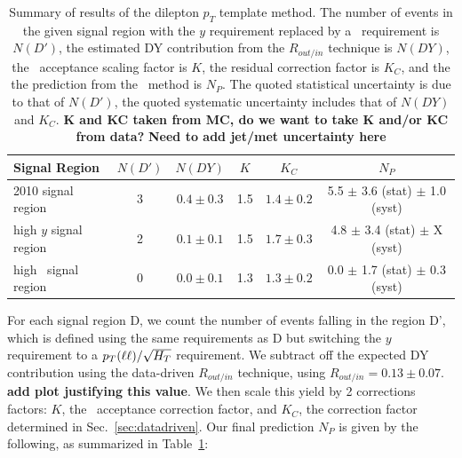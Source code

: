 \begin{table}[hbt]
\begin{center}
\caption{\label{tab:victory} 
Summary of results of the dilepton $p_{T}$ template method.
The number of events in the given signal region with the $y$ requirement replaced by a \ptht\
requirement is $N(D')$, the estimated DY contribution from the $R_{out/in}$ technique is $N(DY)$,
the \met\ acceptance scaling factor is $K$, the residual correction factor is $K_C$, and
the the prediction from the \ptll\ method is $N_P$. The quoted statistical uncertainty is due to
that of $N(D')$, the quoted systematic uncertainty includes that of $N(DY)$ and $K_C$.
{\bf K and KC taken from MC, do we want to take K and/or KC from data? }
{\bf Need to add jet/met uncertainty here}
}
\begin{tabular}{lccccc}
\hline
Signal Region           &  $N(D')$   &   $N(DY)$         &  $K$   &   $K_C$          & $N_P$  \\ 
\hline
2010 signal region      &      3     &   $0.4 \pm 0.3$   &  1.5   &   $1.4 \pm 0.2$  & 5.5 $\pm$ 3.6 (stat) $\pm$ 1.0 (syst) \\
high $y$ signal region  &      2     &   $0.1 \pm 0.1$   &  1.5   &   $1.7 \pm 0.3$  & 4.8 $\pm$ 3.4 (stat) $\pm$ X (syst) \\
high \Ht\ signal region &      0     &   $0.0 \pm 0.1$   &  1.3   &   $1.3 \pm 0.2$  & 0.0 $\pm$ 1.7 (stat) $\pm$ 0.3 (syst) \\
\hline
\end{tabular}
\end{center}
\end{table}

For each signal region D, we count the number of events falling in the region D', which is defined
using the same requirements as D but switching the $y$ requirement to a $p_T(\ell\ell)/\sqrt{H_T}$ requirement.
We subtract off the expected DY contribution using the data-driven $R_{out/in}$ technique, using $R_{out/in} = 0.13 \pm 0.07$.
{\color{red} \bf add plot justifying this value}. We then scale this yield by 2 corrections factors:
$K$, the \met\ acceptance correction factor, and $K_C$, the correction factor determined in Sec.~\ref{sec:datadriven}.
Our final prediction $N_P$ is given by the following, as summarized in Table~\ref{tab:victory}:

